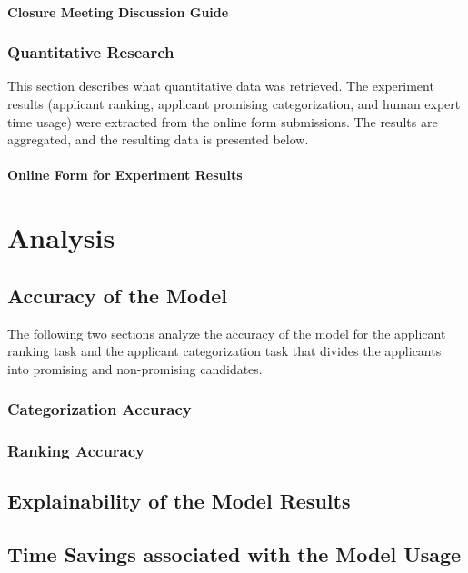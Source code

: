 \documentclass[draft,final]{thesisclass} %
\begin{document}
\subsubsection{Closure Meeting Discussion Guide}
\lipsum[1]

\subsection{Quantitative Research}
This section describes what quantitative data was retrieved.
The experiment results (applicant ranking, applicant promising categorization, and human expert time usage) were extracted from the online form submissions.
The results are aggregated, and the resulting data is presented below.

\subsubsection{Online Form for Experiment Results}
\lipsum[1]

\chapter{Analysis} \label{analysis}

\section{Accuracy of the Model}
The following two sections analyze the accuracy of the model for the applicant ranking task and the applicant categorization task that divides the applicants into promising and non-promising candidates.

\subsection{Categorization Accuracy}
\lipsum[1]

\subsection{Ranking Accuracy}
\lipsum[1]

\section{Explainability of the Model Results}
\lipsum[1]

\section{Time Savings associated with the Model Usage}
\lipsum[1]
\end{document}
